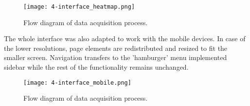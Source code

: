 \begin{figure}[h]
  \begin{center}
    \texttt{[image: 4-interface\_heatmap.png]}
  \end{center}
  \caption{Flow diagram of data acquisition process.}
  \label{fig:interface_heatmap}
\end{figure}

The whole interface was also adapted to work with the mobile devices. In case of the lower resolutions, page elements are redistributed and resized to fit the smaller screen. Navigation transfers to the 'hamburger' menu implemented sidebar while the rest of the functionality remains unchanged.

\begin{figure}[h]
  \begin{center}
    \texttt{[image: 4-interface\_mobile.png]}
  \end{center}
  \caption{Flow diagram of data acquisition process.}
  \label{fig:interface_mobile}
\end{figure}